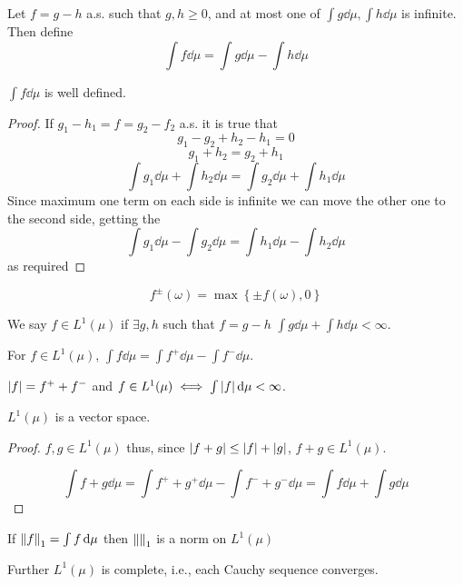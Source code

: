 \begin{definition}
	Let $f=g-h$ a.s. such that $g,h\geq 0$, and at most one of $\int g\dd{\mu}, \int h\dd{\mu}$ is infinite. Then define
	$$\int f\dd{\mu} = \int g\dd{\mu} -\int h\dd{\mu}$$
\end{definition}
\begin{prop}
$\int f\dd{\mu}$ is well defined.
\begin{proof}
	If $g_1-h_1=f=g_2-f_2$ a.s. it is true that
	$$g_1-g_2+h_2-h_1 = 0$$
	$$g_1+h_2=g_2+h_1$$
	$$\int g_1 \dd{\mu} + \int h_2 \dd{\mu} = \int g_2\dd{\mu} + \int h_1\dd{\mu}$$
	Since maximum one term on each side is infinite we can move the other one to the second side, getting the 
	$$\int g_1 \dd{\mu} -\int g_2\dd{\mu}  = \int h_1\dd{\mu} - \int h_2 \dd{\mu} $$
	as required
\end{proof}
\end{prop}

\begin{definition}
	$$f^\pm(\omega) = \max \left\{ \pm f(\omega), 0 \right\}$$
\end{definition}

\begin{definition}
	We say $f\in L^1(\mu)$ if $\exists g,h$ such that $f=g-h$ $\int g \dd{\mu} + \int h\dd{\mu} <\infty$.
	
	For $f \in L^1(\mu)$, $\int f \dd{\mu} = \int f^+ \dd{\mu} - \int f^- \dd{\mu}$.
	
	$\abs{f} = f^++f^-$ and $f\in L^1(\mu) \iff \int \abs{f}\dd{\mu} <\infty$.
\end{definition}

\begin{lemma}
	$L^1(\mu)$ is a vector space.
	\begin{proof}
		$f,g \in L^1(\mu)$ thus, since $\abs{f+g} \leq \abs{f}+\abs{g}$, $f+g\in L^1(\mu)$.
		
		$$\int f+g \dd{\mu} = \int f^++g^+ \dd{\mu} - \int f^- + g^- \dd{\mu} = \int f\dd{\mu} + \int g\dd{\mu} $$
	\end{proof}
\end{lemma}

If $\norm{f}_1 = \int f \dd{\mu} $ then $\norm{}_1$ is a norm on $L^1(\mu)$

Further $L^1(\mu)$ is complete, i.e., each Cauchy sequence converges.

